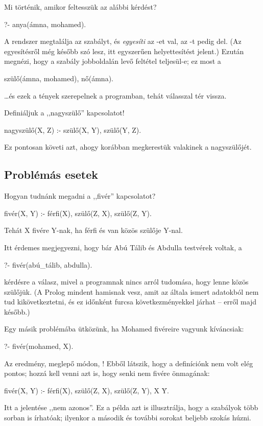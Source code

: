 Mi történik, amikor feltesszük az alábbi kérdést?
\begin{query}
?- anya(ámna, mohamed).
\end{query}
A rendszer megtalálja az  szabályt, és
\emph{egyesíti} az -et \-val, az
-t pedig del. (Az
egyesítésről még később szó lesz, itt egyszerűen
helyettesítést jelent.) Ezután megnézi, hogy a
szabály jobboldalán levő feltétel teljesül-e; ez
most a
\begin{query}
szülő(ámna, mohamed), nő(ámna).
\end{query}
\dots és ezek a tények szerepelnek a programban,
tehát  válasszal tér vissza.

Definiáljuk a ,,nagyszülő'' kapcsolatot!
\begin{program}
nagyszülő(X, Z) :- szülő(X, Y), szülő(Y, Z).
\end{program}
Ez pontosan követi azt, ahogy korábban megkerestük
valakinek a nagyszülőjét.

\subsection*{Problémás esetek}

Hogyan tudnánk megadni a ,,fivér'' kapcsolatot?
\begin{program}
fivér(X, Y) :- férfi(X), szülő(Z, X), szülő(Z, Y).
\end{program}
Tehát X fivére Y-nak, ha férfi és van közös
szülője Y-nal.

Itt érdemes megjegyezni, hogy bár Abú Tálib és
Abdulla testvérek voltak, a
\begin{query}
?- fivér(abú_tálib, abdulla).
\end{query}
kérdésre  a válasz, mivel a programnak
nincs arról tudomása, hogy lenne közös szülőjük. (A
Prolog mindent hamisnak vesz, amit az általa ismert
adatokból nem tud kikövetkeztetni, és ez időnként
furcsa következményekkel járhat -- erről majd
később.)

Egy másik problémába ütközünk, ha Mohamed fivéreire
vagyunk kíváncsiak:
\begin{query}
?- fivér(mohamed, X).
\end{query}
Az eredmény, meglepő módon, ! Ebből
látszik, hogy a definíciónk nem volt elég pontos;
hozzá kell venni azt is, hogy senki nem fivére
önmagának:
\begin{program}
fivér(X, Y) :-
    férfi(X),
    szülő(Z, X), szülő(Z, Y),
    X \= Y.
\end{program}
Itt a \pr{\textbackslash=} jelentése ,,nem azonos''.
\index{\pr{\textbackslash=}} Ez a példa azt is
illusztrálja, hogy a szabályok több sorban is
írhatóak; ilyenkor a második és további sorokat
beljebb szokás húzni.

